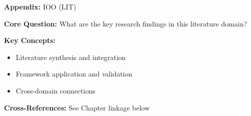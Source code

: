 
\begin{tcolorbox}[colback=blue!5!white, colframe=blue!75!black,
    title=Quick Reference: Appendix UNMAPPED_IOO]
\textbf{Appendix:} IOO (LIT)

\textbf{Core Question:} What are the key research findings in this literature domain?

\textbf{Key Concepts:}
\begin{itemize}[nosep]
\item Literature synthesis and integration
\item Framework application and validation
\item Cross-domain connections
\end{itemize}

\textbf{Cross-References:} See Chapter linkage below
\end{tcolorbox}


\begin{abstract}
This appendix provides a systematic review and integration of key research findings
in the LIT domain. It synthesizes literature relevant to the Evidence-Based
Framework (EBF) and identifies connections to the 10C CORE architecture.
\end{abstract}


